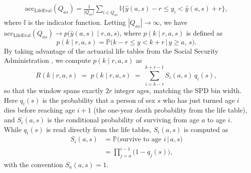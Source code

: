 \begin{align}
    \text{acc}_{\text{LifeEval}}(Q_{as})
    = \frac{1}{|Q_{as}|}\sum_{i\in Q_{as}}
      \mathbb{I}\bigl\{\hat{y}(a,s) - r \le y_i < \hat{y}(a,s) + r \bigr\},
\end{align}
where $\mathbb{I}$ is the indicator function. Letting $|Q_{as}|\to\infty$, we have $\text{acc}_{\text{LifeEval}}(Q_{as}) \rightarrow p\bigl(\hat{y}(a,s) \mid r,a,s\bigr)$, where $p(k \mid r,a,s)$ is defined as
\begin{equation}
    p(k \mid r,a,s) = \mathbb{P}\bigl( k - r \le y < k + r \,\big|\, y\geq a,\, s\bigr).
\end{equation}
By taking advantage of the actuarial life tables from the Social Security Administration \citep{SSA2022LifeTable}, we compute $p(k \mid r,a,s)$ as
\begin{equation}
    R(k \mid r,a,s) \;=\; p(k \mid r,a,s) \;=\; \sum_{i=k-r}^{k+r-1} S_i(a,s)\,q_i(s),
    \label{Def: p(k,r|a,s)}
\end{equation}
so that the window spans exactly $2r$ integer ages, matching the SPD bin width. Here $q_i(s)$ is the probability that a person of sex $s$ who has just turned age $i$ dies before reaching age $i+1$ (the one-year death probability from the life table), and $S_i(a,s)$ is the conditional probability of surviving from age $a$ to age $i$. While $q_i(s)$ is read directly from the life tables, $S_i(a,s)$ is computed as
\begin{equation}
    \begin{split}
        S_i(a, s) &= \mathbb{P}\bigl( \text{survive to age } i \,\big|\, a,s\bigr)\\
        &= \prod_{j=a}^{i-1} \bigl(1-q_j(s)\bigr),
    \end{split}
\end{equation}
with the convention $S_a(a,s)=1$.

